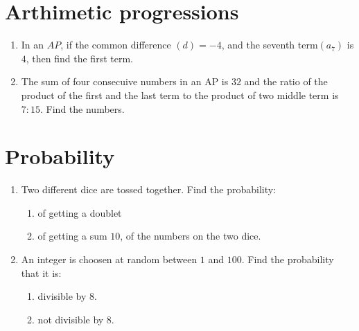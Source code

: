 \documentclass{article}
\begin{document}
			\section{Arthimetic progressions}
		\begin{enumerate}[label=(\roman*)]
			\item In an $AP$, if the common difference $(d) = -4$, and the seventh term$(a_7)$ is $4$, then find the first term.		
			\item The sum of four consecuive numbers in an AP is $32$ and the ratio of the product of the first and the last term to the product of two middle term is $7:15$. Find the numbers.
		\end{enumerate}
\section{Probability}
\begin{enumerate}[label=(\roman*)]
	\item Two different dice are tossed together. Find the probability:\\
		\begin{enumerate}[label=(\roman*)]
	\item of getting a doublet
	\item of getting a sum $10$, of the numbers on the two dice.
\end{enumerate}
\item An integer is choosen at random between $1$ and $100$. Find the probability that it is: \\
	\begin{enumerate}[label=(\roman*)]
		\item divisible by $8$.
		\item not divisible by $8$.
	\end{enumerate}
\end{enumerate}
\end{document}
